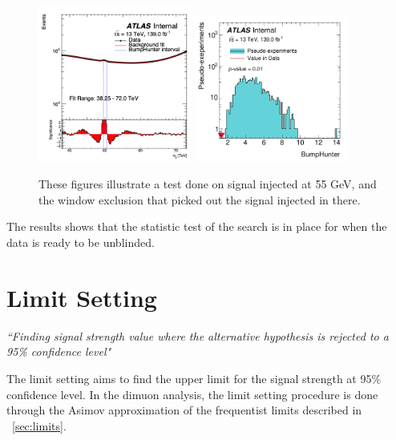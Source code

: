 \begin{figure}[!htb]
    \begin{center}
        \includegraphics[width=0.45\textwidth]{figures/chapter_dimuon/SearchBump}
        \includegraphics[width=0.45\textwidth]{figures/chapter_dimuon/bumpHunterStatPlot_bump}
        \caption{
        These figures illustrate a test done on signal injected at 55 GeV, and the window exclusion that picked out the signal injected in there.}
    \end{center}
\end{figure}
\FloatBarrier

The results shows that the statistic test of the search is in place for when the data is ready to be unblinded.

\section{Limit Setting}

\textit{``Finding signal strength value where the alternative hypothesis is rejected to a 95\% confidence level"}

The limit setting aims to find the upper limit for the signal strength at 95\% confidence level. In the dimuon analysis, the limit setting procedure is done through the Asimov approximation of the frequentist limits described in ~\ref{sec:limits}.

